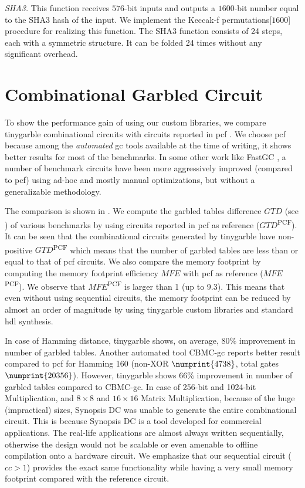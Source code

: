 \textit{SHA3.} This function receives $576$-bit inputs and outputs a $1600$-bit number equal to the SHA3 hash of the input.
We implement the Keccak-f permutations[$1600$] procedure for realizing this function.
The SHA3 function consists of 24 steps, each with a symmetric structure.
It can be folded 24 times without any significant overhead.

\section{Combinational Garbled Circuit}
To show the performance gain of using our custom libraries, we compare \gls{tinygarble} combinational circuits with circuits reported in \gls{pcf} \cite{kreuter2013pcf}.
We choose \gls{pcf} because among the \emph{automated} \acrshort{gc} tools available at the time of writing, it shows better results for most of the benchmarks.
In some other work like FastGC \cite{huang2011faster}, a number of benchmark circuits have been more aggressively improved (compared to \gls{pcf}) using ad-hoc and mostly manual optimizations, but without a generalizable methodology.

The comparison is shown in .
We compute the garbled tables difference $\mathit{GTD}$ (see ) of various benchmarks by using circuits reported in \gls{pcf} as reference ($\mathit{GTD}$\textsuperscript{PCF}).
It can be seen that the combinational circuits generated by \gls{tinygarble} have non-positive $\mathit{GTD}$\textsuperscript{PCF} which means that the number of garbled tables are less than or equal to that of \gls{pcf} circuits.
We also compare the memory footprint by computing the memory footprint efficiency $\mathit{MFE}$ with \gls{pcf} as reference ($\mathit{MFE}$\textsuperscript{PCF}).
We observe that $\mathit{MFE}$\textsuperscript{PCF} is larger than 1 (up to 9.3).
This means that even without using sequential circuits, the memory footprint can be reduced by almost an order of magnitude by using \gls{tinygarble} custom libraries and standard \acrshort{hdl} synthesis.

In case of Hamming distance, \gls{tinygarble} shows, on average, $80\%$ improvement in number of garbled tables.
Another automated tool CBMC-\acrshort{gc} \cite{franz2014cbmc} reports better result compared to \gls{pcf} for Hamming 160 (non-XOR $\numprint{4738}$, total gates $\numprint{20356}$).
However, \gls{tinygarble} shows $66\%$ improvement in number of garbled tables compared to CBMC-\acrshort{gc}.
In case of 256-bit and 1024-bit Multiplication, and $8\times 8$ and $16\times 16$ Matrix Multiplication, because of the huge (impractical) sizes, Synopsis DC was unable to generate the entire combinational circuit.
This is because Synopsis DC is a tool developed for commercial applications.
The real-life applications are almost always written sequentially, otherwise the design would not be scalable or even amenable to offline compilation onto a hardware circuit.
We emphasize that our sequential circuit ($cc>1$) provides the exact same functionality while having a very small memory footprint compared with the reference circuit.

